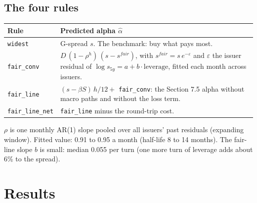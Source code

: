 \documentclass[11pt,a4paper]{article}
\newcommand{\code}[1]{\texttt{\small #1}}
\begin{document}
\subsection*{The four rules}
\begin{center}
\begin{tabularx}{\linewidth}{@{}lX@{}}\toprule
Rule & Predicted alpha $\hat\alpha$ \\\midrule
\code{widest} & G-spread $s$. The benchmark: buy what pays most. \\
\code{fair\_conv} & $D\,(1-\rho^{h})\,(s - s^{fair})$, with $s^{fair} = s\,e^{-\varepsilon}$ and $\varepsilon$ the issuer residual of $\log s_{5y} = a + b\cdot\text{leverage}$, fitted each month across issuers. \\
\code{fair\_line} & $(s - \beta S)\,h/12 + $ \code{fair\_conv}: the Section 7.5 alpha without macro paths and without the loss term. \\
\code{fair\_line\_net} & \code{fair\_line} minus the round-trip cost. \\\bottomrule
\end{tabularx}
\end{center}
$\rho$ is one monthly AR(1) slope pooled over all issuers' past residuals (expanding window). Fitted value: 0.91 to 0.95 a month (half-life 8 to 14 months). The fair-line slope $b$ is small: median 0.055 per turn (one more turn of leverage adds about 6\% to the spread).

\section{Results}
\end{document}
